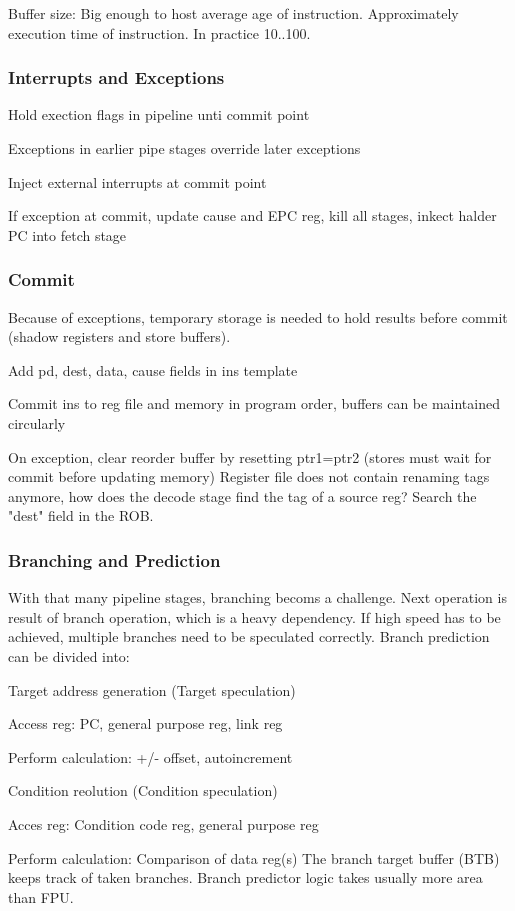 \documentclass[a4paper, fontsize=8pt, landscape, DIV=1]{scrartcl}
\makeatletter
\renewenvironment{outline}[1][]{%
  \ifthenelse{\equal{#1}{}}{}{\renewcommand{\ol@type}{#1}}%
  \ol@z%
  \newcommand{\0}{\ol@toz\ol@z}%
  \newcommand{\1}{\vspace{\dimexpr\outlinespacingscalar\baselineskip-\baselineskip}\ol@toi\ol@i\item}%
  \newcommand{\2}{\vspace{\dimexpr\outlinespacingscalartwo\baselineskip-\baselineskip}\ol@toii\ol@ii\item}%
  \newcommand{\3}{\vspace{\dimexpr\outlinespacingscalar\baselineskip-\baselineskip}\ol@toiii\ol@iii\item}%
  \newcommand{\4}{\vspace{\dimexpr\outlinespacingscalar\baselineskip-\baselineskip}\ol@toiiii\ol@iiii\item}%
}{%
  \ol@toz\ol@exit%
}
\def\outlinespacingscalar{0.5}
\def\outlinespacingscalartwo{0.5}
\makeatother
\begin{document}
\begin{multicols*}{4}
  Buffer size: Big enough to host average age of instruction. Approximately execution
  time of instruction. In practice 10..100.

  \subsubsection{Interrupts and Exceptions}
  \begin{outline}
    \1 Hold exection flags in pipeline unti commit point
    \1 Exceptions in earlier pipe stages override later exceptions
    \1 Inject external interrupts at commit point
    \1 If exception at commit, update cause and EPC reg, kill all stages,
    inkect halder PC into fetch stage
  \end{outline}

  \subsubsection{Commit}
  Because of exceptions, temporary storage is needed to hold results before commit
  (shadow registers and store buffers). 
  \begin{outline}
    \1 Add pd, dest, data, cause fields in ins template
    \1 Commit ins to reg file and memory in program order, buffers can be maintained 
    circularly
    \1 On exception, clear reorder buffer by resetting ptr1=ptr2 (stores must wait
    for commit before updating memory)
  \end{outline}
  Register file does not contain renaming tags anymore, how does the decode stage
  find the tag of a source reg? Search the "dest" field in the ROB.

  \subsubsection{Branching and Prediction}
  With that many pipeline stages, branching becoms a challenge. Next operation is
  result of branch operation, which is a heavy dependency. If high speed has to be
  achieved, multiple branches need to be speculated correctly. 
  Branch prediction can be divided into:
  \begin{outline}
    \1 Target address generation (Target speculation)
      \2 Access reg: PC, general purpose reg, link reg
      \2 Perform calculation: +/- offset, autoincrement
    \1 Condition reolution (Condition speculation)
      \2 Acces reg: Condition code reg, general purpose reg
      \2 Perform calculation: Comparison of data reg(s)
  \end{outline}
  The branch target buffer (BTB) keeps track of taken branches. Branch predictor
  logic takes usually more area than FPU.


\end{multicols*}
\end{document}
